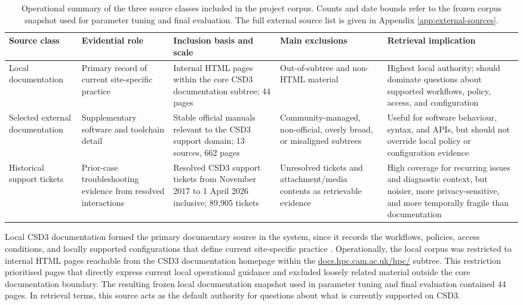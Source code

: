 \begin{table}[t]
\centering
\small
\setlength{\tabcolsep}{4pt}
\renewcommand{\arraystretch}{1.15}
\begin{tabular}{p{2.0cm} p{2.3cm} p{3.0cm} p{1.8cm} p{2.8cm}}
\hline
Source class & Evidential role & Inclusion basis and scale & Main exclusions & Retrieval implication \\
\hline
Local documentation & Primary record of current site-specific practice & Internal HTML pages within the core \ac{CSD3} documentation subtree; 44 pages & Out-of-subtree and non-HTML material & Highest local authority; should dominate questions about supported workflows, policy, access, and configuration \\
Selected external documentation & Supplementary software and toolchain detail & Stable official manuals relevant to the \ac{CSD3} support domain; 13 sources, 662 pages & Community-managed, non-official, overly broad, or misaligned subtrees & Useful for software behaviour, syntax, and APIs, but should not override local policy or configuration evidence \\
Historical support tickets & Prior-case troubleshooting evidence from resolved interactions & Resolved \ac{CSD3} support tickets from November 2017 to 1 April 2026 inclusive; 89,905 tickets & Unresolved tickets and attachment/media contents as retrievable evidence & High coverage for recurring issues and diagnostic context, but noisier, more privacy-sensitive, and more temporally fragile than documentation \\
\hline
\end{tabular}
\caption{Operational summary of the three source classes included in the project corpus. Counts and date bounds refer to the frozen corpus snapshot used for parameter tuning and final evaluation. The full external source list is given in Appendix \ref{app:external-sources}.}
\label{tab:source-class-summary}
\end{table}

Local \ac{CSD3} documentation formed the primary documentary source in the system, since it records the workflows, policies, access conditions, and locally supported configurations that define current site-specific practice \citep{ResearchComputingServicesDocumentation,AskHPC}. Operationally, the local corpus was restricted to internal HTML pages reachable from the CSD3 documentation homepage within the \url{docs.hpc.cam.ac.uk/hpc/} subtree. This restriction prioritised pages that directly express current local operational guidance and excluded loosely related material outside the core documentation boundary. The resulting frozen local documentation snapshot used in parameter tuning and final evaluation contained 44 pages. In retrieval terms, this source acts as the default authority for questions about what is currently supported on \ac{CSD3}. 

